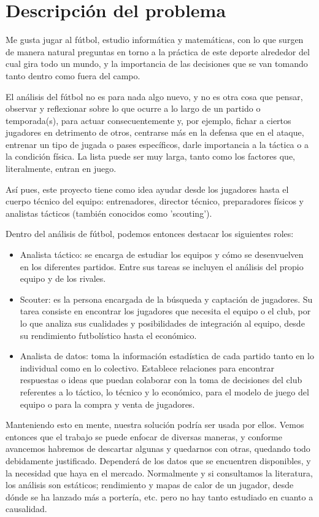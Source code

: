 \chapter{Descripción del problema}

Me gusta jugar al fútbol, estudio informática y matemáticas, con lo que 
surgen de manera natural preguntas en torno a la práctica de este deporte 
alrededor del cual gira todo un mundo, y la importancia de las decisiones 
que se van tomando tanto dentro como fuera del campo.

El análisis del fútbol no es para nada algo nuevo, y no es otra cosa que 
pensar, observar y reflexionar sobre lo que ocurre a lo largo de un partido 
o temporada(s), para actuar consecuentemente y, por ejemplo, fichar a 
ciertos jugadores en detrimento de otros, centrarse más en la defensa 
que en el ataque, entrenar un tipo de jugada o pases específicos, darle 
importancia a la táctica o a la condición física. La lista puede ser muy 
larga, tanto como los factores que, literalmente, entran en juego.

Así pues, este proyecto tiene como idea ayudar desde los jugadores hasta 
el cuerpo técnico del equipo: entrenadores, director técnico, preparadores 
físicos y analistas tácticos (también conocidos como 'scouting').

Dentro del análisis de fútbol, podemos entonces destacar los siguientes roles:

\begin{itemize}
    \item Analista táctico: se encarga de estudiar los equipos y cómo se desenvuelven en los diferentes partidos. Entre sus tareas se incluyen el análisis del propio equipo y de los rivales.
    \item Scouter: es la persona encargada de la búsqueda y captación de jugadores. Su tarea consiste en encontrar los jugadores que necesita el equipo o el club, por lo que analiza sus cualidades y posibilidades de integración al equipo, desde su rendimiento futbolístico hasta el económico.
    \item Analista de datos: toma la información estadística de cada partido tanto en lo individual como en lo colectivo. Establece relaciones para encontrar respuestas o ideas que puedan colaborar con la toma de decisiones del club referentes a lo táctico, lo técnico y lo económico, para el modelo de juego del equipo o para la compra y venta de jugadores.
\end{itemize}
Manteniendo esto en mente, nuestra solución 
podría ser usada por ellos. Vemos entonces 
que el trabajo se puede enfocar de diversas 
maneras, y conforme avancemos habremos de descartar algunas y 
quedarnos con otras, quedando todo debidamente justificado. Dependerá de los 
datos que se encuentren disponibles, y la necesidad que haya en el mercado. 
Normalmente y si consultamos la literatura, los análisis son estáticos; 
rendimiento y mapas de calor de un jugador, desde dónde se ha lanzado más 
a portería, etc. pero no hay tanto estudiado en cuanto a causalidad.

